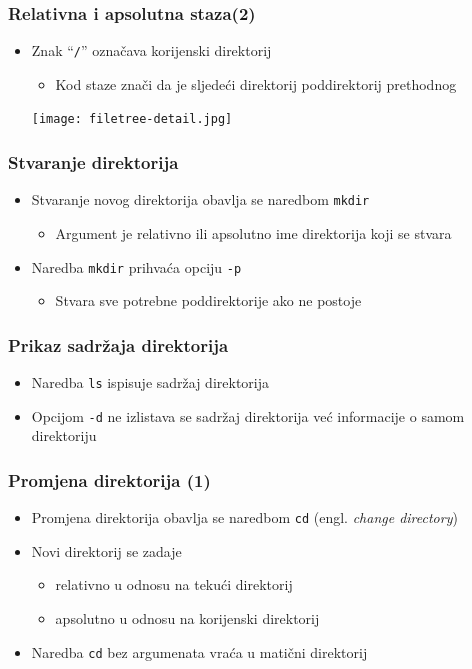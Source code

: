 \documentclass{beamer}
\begin{document}
\begin{frame}[t]
\frametitle{Relativna i apsolutna staza(2)}
\begin{itemize}
  \item Znak ``\texttt{/}'' označava korijenski direktorij
  \begin{itemize}
    \item Kod staze znači da je sljedeći direktorij poddirektorij
          prethodnog
  \end{itemize}
  \centering
  \texttt{[image: filetree-detail.jpg]}
\end{itemize}
\end{frame}

\begin{frame}[t]
\frametitle{Stvaranje direktorija}
\begin{itemize}
  \item Stvaranje novog direktorija obavlja se naredbom \texttt{mkdir}
  \begin{itemize}
    \item Argument je relativno ili apsolutno ime direktorija koji se
          stvara
  \end{itemize}
  \item Naredba \texttt{mkdir} prihvaća opciju \texttt{-p}
  \begin{itemize}
    \item Stvara sve potrebne poddirektorije ako ne postoje
  \end{itemize}
\end{itemize}
\end{frame} 

\begin{frame}[t]
\frametitle{Prikaz sadržaja direktorija}
\begin{itemize}
  \item Naredba \texttt{ls} ispisuje sadržaj direktorija
  \item Opcijom \texttt{-d} ne izlistava se sadržaj direktorija već 
        informacije o samom direktoriju
\end{itemize}
\end{frame}
    

\begin{frame}[t]
\frametitle{Promjena direktorija (1)}
\begin{itemize}
  \item Promjena direktorija obavlja se naredbom \texttt{cd} (engl. 
        \emph{change directory})
  \item Novi direktorij se zadaje 
  \begin{itemize}
    \item relativno u odnosu na tekući direktorij
    \item apsolutno u odnosu na korijenski direktorij  
  \end{itemize}
  \item Naredba \texttt{cd} bez argumenata vraća u matični direktorij
\end{itemize}
\end{frame}
\end{document}
